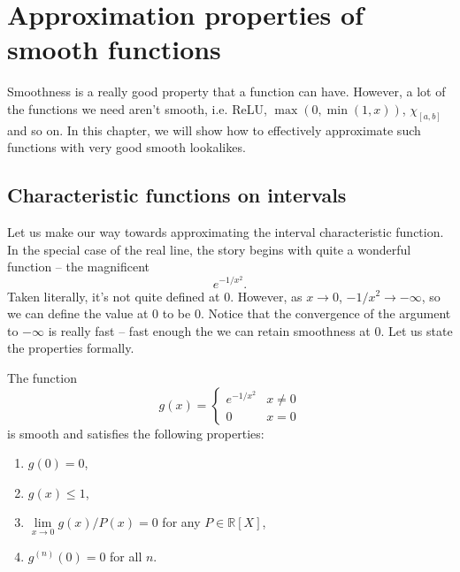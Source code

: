 \chapter{Approximation properties of smooth functions}

Smoothness is a really good property that a function can have. However, a lot of the functions we need aren't smooth, i.e. ReLU, \( \max (0, \min(1, x)) \), \( \chi_{[a,b]} \) and so on. In this chapter, we will show how to effectively approximate such functions with very good smooth lookalikes.

\section{Characteristic functions on intervals}

Let us make our way towards approximating the interval characteristic function. In the special case of the real line, the story begins with quite a wonderful function -- the magnificent
\[ 
    e^{-1/x^2}.
\]
Taken literally, it's not quite defined at \( 0 \). However, as \( x \to 0 \), \( -1/x^2 \to -\infty \), so we can define the value at \( 0 \) to be \( 0 \). Notice that the convergence of the argument to \( -\infty \) is really fast -- fast enough the we can retain smoothness at \( 0\). Let us state the properties formally.

\begin{lemma}
    The function
    \[ 
       g(x) =
       \begin{cases}
           e^{-1/x^2} & x \neq 0 \\
           0          & x = 0
       \end{cases}
   \]
   is smooth and satisfies the following properties:
   \begin{enumerate}
       \item \( g(0) = 0 \),
       \item \( g(x) \leq 1 \),
       \item \( \lim\limits_{x \to 0} g(x)/P(x) = 0 \) for any \( P \in \mathbb{R}[X] \),
       \item \( g^{(n)}(0) = 0 \) for all \( n \).
   \end{enumerate}
\end{lemma}

